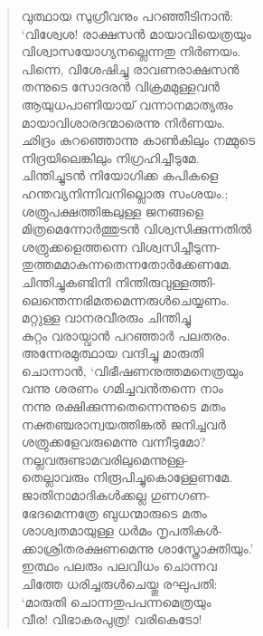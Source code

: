 \begin{verse}
വുത്ഥായ സുഗ്രീവനും പറഞ്ഞീടിനാന്‍:\\
‘വിശ്വേശ! രാക്ഷസന്‍ മായാവിയെത്രയും\\
വിശ്വാസയോഗ്യനല്ലെന്നതു നിര്‍ണയം.\\
പിന്നെ, വിശേഷിച്ചു രാവണരാക്ഷസന്‍\\
തന്നുടെ സോദരന്‍ വിക്രമമുള്ളവന്‍\\
ആയുധപാണിയായ് വന്നാനമാത്യരും\\
മായാവിശാരദന്മാരെന്നു നിര്‍ണയം.\\
ഛിദ്രം കുറഞ്ഞൊന്നു കാണ്‍കിലും നമ്മുടെ\\
നിദ്രയിലെങ്കിലും നിഗ്രഹിച്ചീടുമേ.\\
ചിന്തിച്ചുടന്‍ നിയോഗിക്ക കപികളെ\\
ഹന്തവ്യനിന്നിവനില്ലൊരു സംശയം.;\\
ശത്രുപക്ഷത്തിങ്കലുള്ള ജനങ്ങളെ\\
മിത്രമെന്നോര്‍ത്തുടന്‍ വിശ്വസിക്കുന്നതില്‍\\
ശത്രുക്കളെത്തന്നെ വിശ്വസിച്ചീടുന്ന-\\
തുത്തമമാകുന്നതെന്നതോര്‍ക്കേണമേ.\\
ചിന്തിച്ചുകണ്ടിനി നിന്തിരുവുള്ളത്തി-\\
ലെന്തെന്നഭിമതമെന്നരുള്‍ചെയ്യണം.\\
മറ്റുള്ള വാനരവീരരും ചിന്തിച്ചു\\
കുറ്റം വരായ്വാന്‍ പറഞ്ഞാര്‍ പലതരം.\\
അന്നേരമുത്ഥായ വന്ദിച്ചു മാരുതി\\
ചൊന്നാന്‍, ‘വിഭീഷണനുത്തമനെത്രയും\\
വന്നു ശരണം ഗമിച്ചവന്‍തന്നെ നാം\\
നന്നു രക്ഷിക്കുന്നതെന്നെന്നുടെ മതം\\
നക്തഞ്ചരാന്വയത്തിങ്കല്‍ ജനിച്ചവര്‍\\
ശത്രുക്കളേവരുമെന്നു വന്നീടുമോ?\\
നല്ലവരുണ്ടാമവരിലുമെന്നുള്ള-\\
തെല്ലാവരും നിരൂപിച്ചുകൊള്ളേണമേ.\\
ജാതിനാമാദികള്‍ക്കല്ല ഗുണഗണ-\\
ഭേദമെന്നത്രേ ബുധന്മാരുടെ മതം\\
ശാശ്വതമായുള്ള ധര്‍മം നൃപതികള്‍-\\
ക്കാശ്രിതരക്ഷണമെന്നു ശാസ്ത്രോക്തിയും.’\\
ഇത്ഥം പലരും പലവിധം ചൊന്നവ\\
ചിത്തേ ധരിച്ചരുള്‍ചെയ്തു രഘുപതി:\\
‘മാരുതി ചൊന്നതുപപന്നമെത്രയും\\
വീര! വിഭാകരപുത്ര! വരികെടോ!\\

\end{verse}
